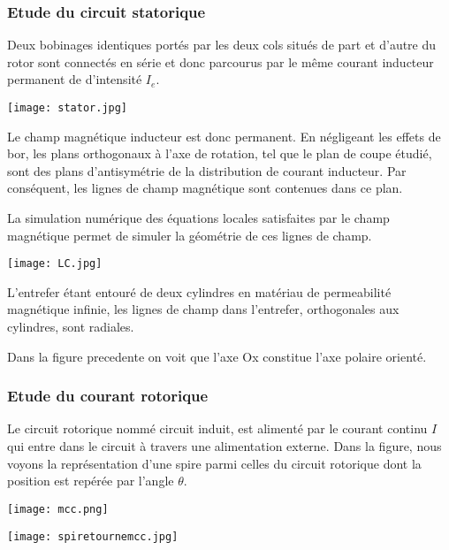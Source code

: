 \documentclass{article}
\begin{document}
\subsubsection{Etude du circuit statorique}

Deux bobinages identiques portés par les deux cols situés de part et d'autre du rotor sont connectés en série et donc parcourus par le même courant inducteur permanent de d'intensité $I_e$.\medskip

\begin{center}
    \texttt{[image: stator.jpg]}
\end{center}

Le champ magnétique inducteur est donc permanent. En négligeant les effets de bor, les plans orthogonaux à l'axe de rotation, tel que le plan de coupe étudié, sont des plans d'antisymétrie de la distribution de courant inducteur. Par conséquent, les lignes de champ magnétique sont contenues dans ce plan.\medskip

La simulation numérique des équations locales satisfaites par le champ magnétique permet de simuler la géométrie de ces lignes de champ.\medskip

\begin{center}
    \texttt{[image: LC.jpg]}
\end{center}

L'entrefer étant entouré de deux cylindres en matériau de permeabilité magnétique infinie, les lignes de champ dans l'entrefer, orthogonales aux cylindres, sont radiales.\medskip

Dans la figure precedente on voit que l'axe Ox constitue l'axe polaire orienté.

\subsubsection{Etude du courant rotorique}

Le circuit rotorique nommé circuit induit, est alimenté par le courant continu $I$ qui entre dans le circuit à travers une alimentation externe. Dans la figure, nous voyons la représentation d'une spire parmi celles du circuit rotorique dont la position est repérée par l'angle $\theta$. \medskip

\begin{center}
    \texttt{[image: mcc.png]}
\end{center}


\begin{center}
    \texttt{[image: spiretournemcc.jpg]}
\end{center}
\end{document}
